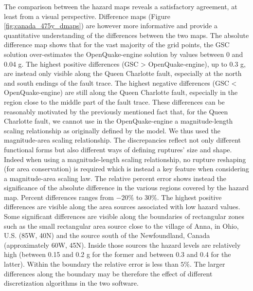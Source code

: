 The comparison between the hazard maps reveals a satisfactory agreement, at least from a visual perspective. Difference maps (Figure \ref{fig:canada_475y_dmaps}) are however more informative and provide a quantitative understanding of the differences between the two maps. The absolute difference map shows that for the vast majority of the grid points, the GSC solution over-estimates the OpenQuake-engine solution by values between 0 and 0.04 g. The highest positive differences (GSC > OpenQuake-engine), up to 0.3 g, are instead only visible along the Queen Charlotte fault, especially at the north and south endings of the fault trace. The highest negative differences (GSC < OpenQuake-engine) are still along the Queen Charlotte fault, especially in the region close to the middle part of the fault trace. These differences can be reasonably motivated by the previously mentioned fact that, for the Queen Charlotte fault, we cannot use in the OpenQuake-engine a magnitude-length scaling relationship as originally defined by the model. We thus used the \cite{wells1994} magnitude-area scaling relationship. The discrepancies reflect not only different functional forms but also different ways of defining ruptures' size and shape. Indeed when using a magnitude-length scaling relationship, no rupture reshaping (for area conservation) is required which is instead a key feature when considering a magnitude-area scaling law. The relative percent error shows instead the significance of the absolute difference in the various regions covered by the hazard map. Percent differences ranges from $-20\%$ to $30\%$. The highest positive differences are visible along the area sources associated with low hazard values. Some significant differences are visible along the boundaries of rectangular zones such as the small rectangular area source close to the village of Anna, in Ohio, U.S. (85W, 40N) and the source south of the Newfoundland, Canada (approximately 60W, 45N). Inside those sources the hazard levels are relatively high (between 0.15 and 0.2 g for the former and between 0.3 and 0.4 for the latter). Within the boundary the relative error is less than $5\%$. The larger differences along the boundary may be therefore the effect of different discretization algorithms in the two software.